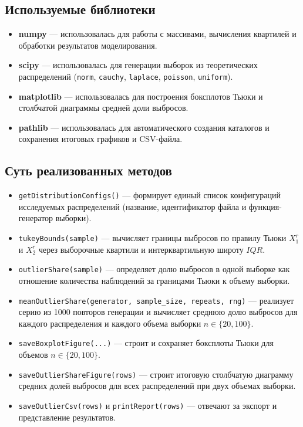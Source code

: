 \documentclass[a4paper, 14pt]{extarticle}
\begin{document}
\subsection{Используемые библиотеки}
    \begin{itemize}
        \item \textbf{numpy} --- использовалась для работы с массивами, вычисления квартилей и обработки результатов моделирования.
        \item \textbf{scipy} --- использовалась для генерации выборок из теоретических распределений (\texttt{norm}, \texttt{cauchy}, \texttt{laplace}, \texttt{poisson}, \texttt{uniform}).
        \item \textbf{matplotlib} --- использовалась для построения боксплотов Тьюки и столбчатой диаграммы средней доли выбросов.
        \item \textbf{pathlib} --- использовалась для автоматического создания каталогов и сохранения итоговых графиков и CSV-файла.
    \end{itemize}

\subsection{Суть реализованных методов}

\begin{itemize}
    \item \texttt{getDistributionConfigs()} — формирует единый список конфигураций исследуемых распределений (название, идентификатор файла и функция-генератор выборки).
    \item \texttt{tukeyBounds(sample)} — вычисляет границы выбросов по правилу Тьюки $X_1^r$ и $X_2^r$ через выборочные квартили и интерквартильную широту $IQR$.
    \item \texttt{outlierShare(sample)} — определяет долю выбросов в одной выборке как отношение количества наблюдений за границами Тьюки к объему выборки.
    \item \texttt{meanOutlierShare(generator, sample\_size, repeats, rng)} — реализует серию из 1000 повторов генерации и вычисляет среднюю долю выбросов для каждого распределения и каждого объема выборки $n \in \{20, 100\}$.
    \item \texttt{saveBoxplotFigure(...)} — строит и сохраняет боксплоты Тьюки для объемов $n \in \{20, 100\}$.
    \item \texttt{saveOutlierShareFigure(rows)} — строит итоговую столбчатую диаграмму средних долей выбросов для всех распределений при двух объемах выборки.
    \item \texttt{saveOutlierCsv(rows)} и \texttt{printReport(rows)} — отвечают за экспорт и представление результатов.
\end{itemize}
\end{document}

